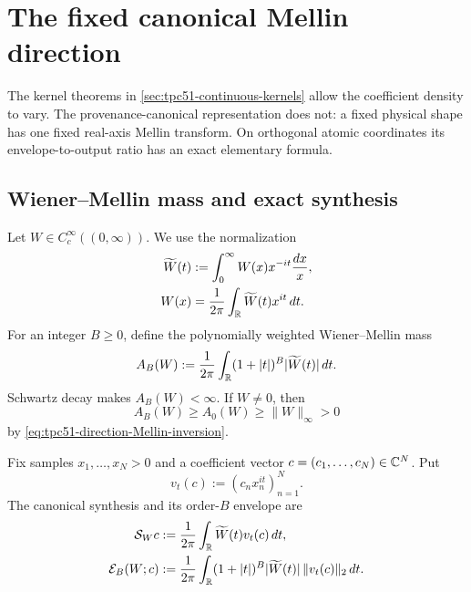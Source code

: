 \section{The fixed canonical Mellin direction}
\label{sec:tpc51-canonical-direction}

The kernel theorems in \cref{sec:tpc51-continuous-kernels} allow the
coefficient density to vary.  The provenance-canonical representation
does not: a fixed physical shape has one fixed real-axis Mellin
transform.  On orthogonal atomic coordinates its envelope-to-output
ratio has an exact elementary formula.

\subsection{Wiener--Mellin mass and exact synthesis}

Let \(W\in C_c^\infty((0,\infty))\).  We use the normalization
\begin{align}
 \widetilde W(t)
 &:=\int_0^\infty W(x)x^{-it}\frac{dx}{x},
 \label{eq:tpc51-direction-Mellin-transform}\\
 W(x)
 &=\frac1{2\pi}\int_\mathbb R\widetilde W(t)x^{it}\,dt.
 \label{eq:tpc51-direction-Mellin-inversion}
\end{align}
For an integer \(B\ge0\), define the polynomially weighted
Wiener--Mellin mass
\begin{equation}
 A_B(W)
 :=\frac1{2\pi}\int_\mathbb R(1+|t|)^B
       |\widetilde W(t)|\,dt.
 \label{eq:tpc51-Wiener-Mellin-mass}
\end{equation}
Schwartz decay makes \(A_B(W)<\infty\).  If \(W\ne0\), then
\begin{equation}
 A_B(W)\ge A_0(W)\ge\|W\|_\infty>0
 \label{eq:tpc51-Wiener-lower}
\end{equation}
by \eqref{eq:tpc51-direction-Mellin-inversion}.

Fix samples \(x_1,\ldots,x_N>0\) and a coefficient vector
\(c=(c_1,\ldots,c_N)\in\mathbb C^N\).  Put
\begin{equation}
 v_t(c):=(c_nx_n^{it})_{n=1}^N.
 \label{eq:tpc51-canonical-phase-vector}
\end{equation}
The canonical synthesis and its order-\(B\) envelope are
\begin{align}
 \mathcal S_Wc
 &:=\frac1{2\pi}\int_\mathbb R\widetilde W(t)v_t(c)\,dt,
 \label{eq:tpc51-direction-canonical-synthesis}\\
 \mathcal E_B(W;c)
 &:=\frac1{2\pi}\int_\mathbb R(1+|t|)^B
     |\widetilde W(t)|\,\|v_t(c)\|_2\,dt.
 \label{eq:tpc51-canonical-envelope}
\end{align}


